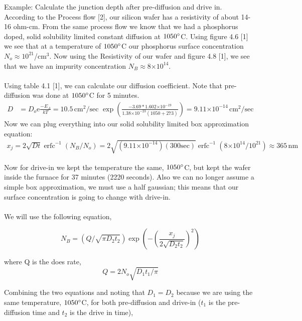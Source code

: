 \documentclass{article}
\newcommand{\me}{\mathrm{e}}
\providecommand{\e}[1]{\ensuremath{\times 10^{#1}}}
\DeclareMathOperator\erfc{erfc}
\begin{document}
Example: Calculate the junction depth after pre-diffusion and drive in. \\
According to the Process flow [2], our silicon wafer has a resistivity of about 14-16 ohm-cm. From the same process flow we know that we had a phosphorus doped, solid solubility limited constant diffusion at $1050\degree$C. Using figure 4.6 [1] we see that at a temperature of $1050\degree$C our phosphorus surface concentration $N_o \approx 10^{21}$/$\text{cm}^3$. Now using the Resistivity of our wafer and figure 4.8 [1], we see that we have an impurity concentration $N_B \approx 8\e{14}$. \\ \\
Using table 4.1 [1], we can calculate our diffusion coefficient. Note that pre-diffusion was done at $1050\degree$C for 5 minutes.
\begin{align*}
D &= D_o\me{\frac{-E_A}{kT}} = 10.5 \,\text{cm}^2/\text{sec}\,\, \exp{(\frac{-3.69*1.602\e{-19}}{1.38\e{-23}(1050 + 273)})} = 9.11\e{-14} \, \text{cm}^2/\text{sec}
\end{align*}
Now we can plug everything into our solid solubility limited box approximation equation:
\begin{align*}
x_j = 2\sqrt{Dt}\erfc^{-1}{(N_B/N_o)} = 2\sqrt{(9.11\e{-14})(300\text{sec})} \erfc^{-1}{(8\e{14}/10^{21})} \approx 365 \,\text{nm}
\end{align*}

Now for drive-in we kept the temperature the same, $1050\degree$C, but kept the wafer inside the furnace for 37 minutes (2220 seconds). Also we can no longer assume a simple box approximation, we must use a half gaussian; this means that our surface concentration is going to change with drive-in. \\\\
We will use the following equation,

\begin{equation}
N_B = (Q/\sqrt{\pi D_2t_2})\exp{(-(\frac{x_j}{2\sqrt{D_2t_2}})^2)}
\end{equation}

where Q is the does rate,
\begin{equation}
Q = 2N_o\sqrt{D_1t_1/\pi}
\end{equation}

Combining the two equations and noting that $D_1 = D_2$ because we are using the same temperature, $1050\degree$C, for both pre-diffusion and drive-in ($t_1$ is the pre-diffusion time and $t_2$ is the drive in time),
\end{document}
